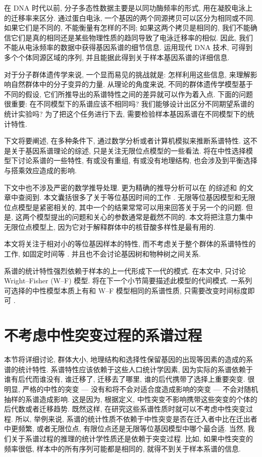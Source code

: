 \documentclass[12pt]{article}
\begin{document}
在 DNA 时代以前, 分子多态性数据主要是以同功酶频率的形式, 用在凝胶电泳上的迁移率来区分.
通过蛋白电泳, 一个基因的两个同源拷贝可以区分为相同或不同.
如果它们是不同的, 不能衡量有怎样的不同; 如果这两个拷贝是相同的, 我们不能确信它们是真的相同还是某些物理性质的趋同导致了电泳迁移率的相似.
因此, 我们不能从电泳频率的数据中获得基因系谱的细节信息.
运用现代 DNA 技术, 可得到多个个体同源区域的序列, 并且能据此得到关于样本基因系谱的详细信息.

对于分子群体遗传学来说, 一个显而易见的挑战就是: 怎样利用这些信息, 来理解影响自然群体中的分子变异的力量.
从理论的角度来说, 不同的群体遗传学模型基于不同的假设, 它们所推导出的系谱特性之间的差异就可以作为着入点.
下面的问题很重要: 在不同模型下的系谱应该不相同吗? 我们能够设计出区分不同期望系谱的统计实验吗?
为了把这个任务进行下去, 需要检验样本基因系谱在不同模型下的统计特性.

下文将要阐述, 在多种条件下, 通过数学分析或者计算机模拟来推断系谱特性.
这不是关于基因系谱理论的综述, 只是关注无限位点模型的一些看法.
将在中性选择模型下讨论系谱的一些特性, 有或没有重组, 有或没有地理结构, 也会涉及到平衡选择与搭乘效应造成的影响.

下文中也不涉及严密的数学推导处理.
更为精确的推导分析可以在 \textcite{tavare1984} 的综述和 \textcite{watterson1984} 的文章中查阅到.
本文囊括很多了关于等位基因时间的工作 \parencite{donnelly1986, donnelly1986a, tavare1989}.
无限等位基因模型和无限位点模型是紧密相关的, 其中一个的结果常常可以用来回答关于另一个的问题.
但是, 这两个模型提出的问题和关心的参数通常是截然不同的.
本文将把注意力集中无限位点模型上, 因为它对于解释群体中的核苷酸多样性是最有用的.

本文将关注于相对小的等位基因样本的特性, 而不考虑关于整个群体的系谱特性的工作, 如固定时间等
\parencite{donnelly1987, watterson1982, watterson1982b}.
并且也不会讨论基因树和物种树之间关系.

系谱的统计特性强烈依赖于样本的上一代形成下一代的模式. 在本文中, 只讨论 Wright--Fisher (W--F) 模型.
将在下一个小节简要描述此模型的代间模式.
一系列可选择的中性模型本质上有和 W--F 模型相同的系谱性质, 只需要改变时间标度即可 \parencite{watterson1975, tavare1984, ewens1990}.

\section{不考虑中性突变过程的系谱过程}

本节将详细讨论, 群体大小, 地理结构和选择性保留基因的出现等因素的造成的系谱的统计特性.
系谱特性应该依赖于这些人口统计学因素, 因为实际的系谱依赖于谁有后代而谁没有, 谁迁移了, 迁移去了哪里, 谁的后代携带了选择上重要突变.
很明显, 严格的中性的突变 --- 没有和将不会对适合度造成影响的突变 --- 不会对随机抽样的系谱造成影响.
这是因为, 根据定义, 中性突变不影响携带这些突变的个体的后代数或者迁移趋势.
既然这样, 在研究这些系谱性质时就可以不考虑中性突变过程.
所以, 举例来说, 系谱的统计性质不依赖于中性突变是否在迁入者中比在迁出者中更频繁, 或者无限位点, 有限位点还是无限等位基因模型中哪个最合适.
当然, 我们关于系谱过程的推理的统计学性质还是依赖于突变过程.
比如, 如果中性突变的频率很低, 样本中的所有序列可能都是相同的, 就得不到关于样本系谱的信息.
\end{document}
